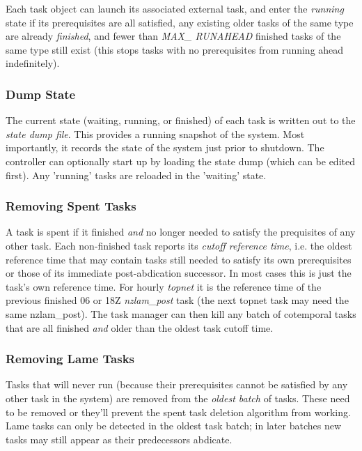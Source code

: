 \documentclass[11pt,a4paper]{report}
\begin{document}
Each task object can launch its associated external task, and enter the
{\em running} state if its prerequisites are all satisfied, any existing
older tasks of the same type are already {\em finished}, and fewer than
{\em MAX\_ RUNAHEAD} finished tasks of the same type still exist (this
stops tasks with no prerequisites from running ahead indefinitely).

\subsubsection{Dump State} 

The current state (waiting, running, or finished) of each task is
written out to the {\em state dump file}.  This provides a running
snapshot of the system. Most importantly, it records the state of the
system just prior to shutdown. The controller can optionally start up
by loading the state dump (which can be edited first). Any 'running'
tasks are reloaded in the 'waiting' state.

\subsubsection{Removing Spent Tasks} 

A task is spent if it finished {\em and} no longer needed to satisfy the
prequisites of any other task. Each non-finished task reports its {\em
cutoff reference time}, i.e. the oldest reference time that may contain
tasks still needed to satisfy its own prerequisites or those of its
immediate post-abdication successor.  In most cases this is just the
task's own reference time. For hourly {\em topnet} it is the reference
time of the previous finished 06 or 18Z {\em nzlam\_post} task (the next
topnet task may need the same nzlam\_post). The task manager can then
kill any batch of cotemporal tasks that are all finished {\em and} older
than the oldest task cutoff time.

\subsubsection{Removing Lame Tasks} 

Tasks that will never run (because their prerequisites cannot be
satisfied by any other task in the system) are removed from the {\em
oldest batch} of tasks.  These need to be removed or they'll prevent the
spent task deletion algorithm from working. Lame tasks can only be
detected in the oldest task batch; in later batches new tasks may still
appear as their predecessors abdicate.
\end{document}
